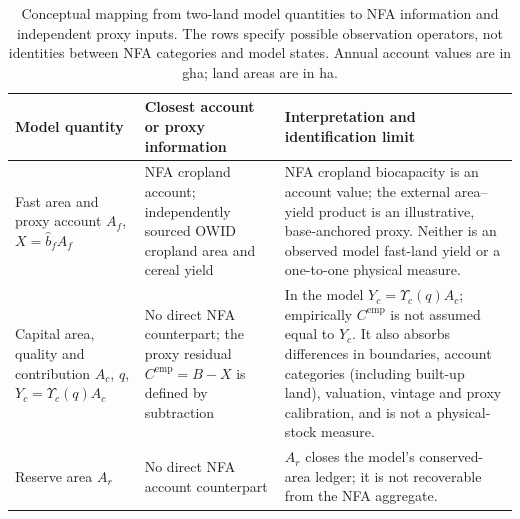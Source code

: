 \documentclass[11pt,a4paper]{article}
\newcommand{\Ups}{\Upsilon_c}
\begin{document}
\begin{table}[htbp]
\centering\small
\caption{Conceptual mapping from two-land model quantities to NFA information and independent proxy inputs. The rows specify possible observation operators, not identities between NFA categories and model states. Annual account values are in gha; land areas are in ha.}
\label{tab:si_model_nfa}
\begin{tabularx}{\textwidth}{>{\raggedright\arraybackslash}p{} >{\raggedright\arraybackslash}p{} X}
\toprule
Model quantity & Closest account or proxy information & Interpretation and identification limit \\
\midrule
Fast area and proxy account $A_f$, $X=\hat b_fA_f$ & NFA cropland account; independently sourced OWID cropland area and cereal yield & NFA cropland biocapacity is an account value; the external area--yield product is an illustrative, base-anchored proxy. Neither is an observed model fast-land yield or a one-to-one physical measure. \\
Capital area, quality and contribution $A_c$, $q$, $Y_c=\Ups(q)A_c$ & No direct NFA counterpart; the proxy residual $C^{\mathrm{emp}}=B-X$ is defined by subtraction & In the model $Y_c=\Ups(q)A_c$; empirically $C^{\mathrm{emp}}$ is not assumed equal to $Y_c$. It also absorbs differences in boundaries, account categories (including built-up land), valuation, vintage and proxy calibration, and is not a physical-stock measure. \\
Reserve area $A_r$ & No direct NFA account counterpart & $A_r$ closes the model's conserved-area ledger; it is not recoverable from the NFA aggregate. \\
\bottomrule
\end{tabularx}
\end{table}
\end{document}
